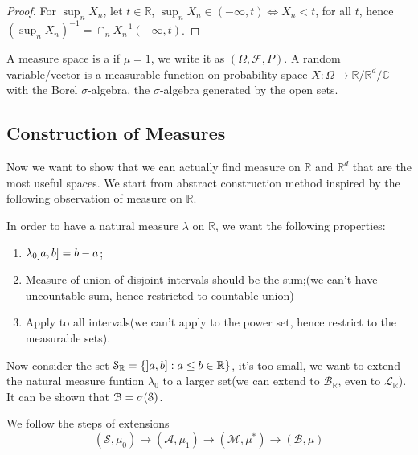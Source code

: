 \begin{proof}
    For \(\sup_{n} X_{n}\), let \(t \in \mathbb{R}\), \(\sup_{n} X_{n} \in (-\infty, t) \iff X_{n} < t\), for all \(t\), hence \((\sup_{n} X_{n})^{-1} = \cap_{n} X_{n} ^{-1} (- \infty, t)\).    
\end{proof}


A measure space is a  if \(\mu =1\), we write it as \((\Omega, \mathcal{F}, P)\). A random variable/vector is a measurable function on probability space \(X: \Omega \to \mathbb{R}/\mathbb{R}^{d}/\mathbb{C}\) with the Borel \(\sigma\)-algebra, the \(\sigma\)-algebra generated by the open sets.

\subsection{Construction of Measures}


Now we want to show that we can actually find measure on \(\mathbb{R}\) and \(\mathbb{R}^{d}\) that are the most useful spaces. We start from abstract construction method inspired by the following observation of measure on \(\mathbb{R}\).

In order to have a natural measure \(\lambda\) on \(\mathbb{R}\), we want the following properties:
\begin{enumerate}
    \item \(\lambda_{0} \linterval{a}{b} = b - a \);
    \item Measure of union of disjoint intervals should be the sum;(we can't have uncountable sum, hence restricted to countable union)
    \item Apply to all intervals(we can't apply to the power set, hence restrict to the measurable sets).
\end{enumerate}

Now consider the set \(\mathcal{S}_{\mathbb{R}} = \Bqty{\linterval{a}{b} : a\leq b \in \mathbb{R}}\), it's too small, we want to extend the natural measure funtion \(\lambda_{0}\) to a larger set(we can extend to \(\mathcal{B}_{\mathbb{R}}\), even to \(\mathcal{L}_{\mathbb{R}}\)). It can be shown that \(\mathcal{B} = \sigma \pqty{\mathcal{S}}\). 



We follow the steps of extensions
\begin{equation*}
    (\mathcal{S}, \mu_{0}) \to (\mathcal{A}, \mu_{1}) \to (\mathcal{M}, \mu^{*}) \to (\mathcal{B}, \mu)
\end{equation*}

